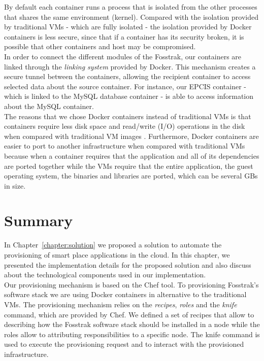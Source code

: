 By default each container runs a process that is isolated from the other processes that shares the same
environment (kernel). Compared with the isolation provided by traditional \glspl{VM} - which are fully
isolated - the isolation provided by Docker containers is less secure, since that if a container has
its security broken, it is possible that other containers and host may be compromised.\\

In order to connect the different modules of the Fosstrak, our containers are
linked through the \textit{linking system} provided by Docker. This mechanism creates a secure tunnel
between the containers, allowing the recipient container to access selected data about the source container.
For instance, our \gls{EPCIS} container - which is linked to the MySQL database container - is able to
access information about the MySQL container.\\

The reasons that we chose Docker containers instead of traditional \glspl{VM} is that containers
require less disk space and read/write (I/O) operations in the disk when compared with traditional
\gls{VM} images \cite{merkel2014docker}. Furthermore, Docker containers are easier to port to another
infrastructure when compared with traditional \glspl{VM} because when a container requires that the
application and all of its dependencies are ported together while the \glspl{VM} require that the
entire application, the guest operating system, the binaries and libraries are ported, which can be
several \glspl{GB} in size.

\section{Summary}
\label{sec:impl_summary}
In Chapter~\ref{chapter:solution} we proposed a solution to automate the provisioning of smart place
applications in the cloud. In this chapter, we presented the implementation details for the proposed
solution and also discuss about the technological components used in our implementation.\\

Our provisioning mechanism is based on the Chef tool. To provisioning Fosstrak's software stack we are
using Docker containers in alternative to the traditional \glspl{VM}. The provisioning mechanism relies
on the \textit{recipes}, \textit{roles} and the \textit{knife} command, which are provided by Chef.
We defined a set of recipes that allow to describing how the Fosstrak software stack should be installed
in a node while the roles allow to attributing responsibilities to a specific node. The knife command
is used to execute the provisioning request and to interact with the provisioned infrastructure.\\

